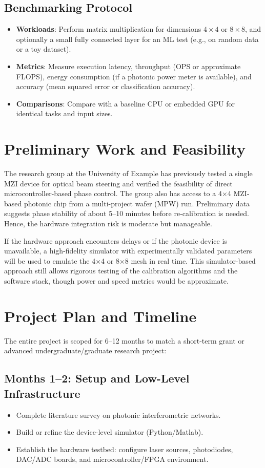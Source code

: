 \documentclass[conference]{IEEEtran}
\begin{document}
\subsection{Benchmarking Protocol}
\begin{itemize}
    \item \textbf{Workloads}: Perform matrix multiplication for dimensions $4\times4$ or $8\times8$, and optionally a small fully connected layer for an ML test (e.g., on random data or a toy dataset).
    \item \textbf{Metrics}: Measure execution latency, throughput (OPS or approximate FLOPS), energy consumption (if a photonic power meter is available), and accuracy (mean squared error or classification accuracy).
    \item \textbf{Comparisons}: Compare with a baseline CPU or embedded GPU for identical tasks and input sizes.
\end{itemize}

\section{Preliminary Work and Feasibility}
The research group at the University of Example has previously tested a single MZI device for optical beam steering and verified the feasibility of direct microcontroller-based phase control. The group also has access to a 4$\times$4 MZI-based photonic chip from a multi-project wafer (MPW) run. Preliminary data suggests phase stability of about 5--10 minutes before re-calibration is needed. Hence, the hardware integration risk is moderate but manageable.

If the hardware approach encounters delays or if the photonic device is unavailable, a high-fidelity simulator with experimentally validated parameters will be used to emulate the 4$\times$4 or 8$\times$8 mesh in real time. This simulator-based approach still allows rigorous testing of the calibration algorithms and the software stack, though power and speed metrics would be approximate.

\section{Project Plan and Timeline}
The entire project is scoped for 6--12 months to match a short-term grant or advanced undergraduate/graduate research project:

\subsection{Months 1--2: Setup and Low-Level Infrastructure}
\begin{itemize}
    \item Complete literature survey on photonic interferometric networks.
    \item Build or refine the device-level simulator (Python/Matlab).
    \item Establish the hardware testbed: configure laser sources, photodiodes, DAC/ADC boards, and microcontroller/FPGA environment.
\end{itemize}
\end{document}
